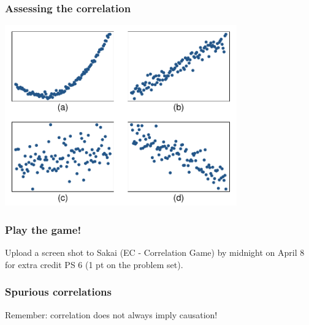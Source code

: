 \documentclass[11pt,containsverbatim,handout,xcolor=xelatex,dvipsnames,table]{beamer}
\newcommand{\soln}[1]{}
\begin{document}
\begin{frame}
\frametitle{Assessing the correlation}


{
\begin{center}
\includegraphics[width=0.75\textwidth]{figures/cor/cor}
\end{center}
}
{
\soln{\only<2>{\red{
(b) $\rightarrow$ correlation means \underline{linear} association
}}}
}

\end{frame}


\begin{frame}
\frametitle{Play the game!}

\vfill

Upload a screen shot to Sakai (EC - Correlation Game) by midnight on April 8
for extra credit PS 6 (1 pt on the problem set).


\vfill

\end{frame}


\begin{frame}
\frametitle{Spurious correlations}

\vfill

Remember: correlation does not always imply causation!


\vfill

\end{frame}
\end{document}

